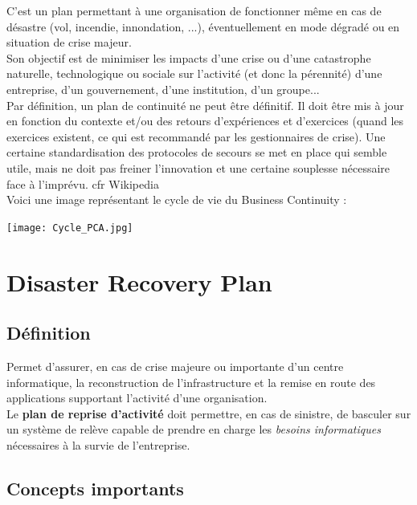 \documentclass{report}
\begin{document}
C'est un plan permettant à une organisation de fonctionner même en cas de désastre (vol, incendie, innondation, ...), éventuellement en mode dégradé ou en situation de crise majeur.\\
Son objectif est de minimiser les impacts d’une crise ou d’une catastrophe naturelle, technologique ou sociale sur l’activité (et donc la pérennité) d’une entreprise, d’un gouvernement, d’une institution, d’un groupe...\\

Par définition, un plan de continuité ne peut être définitif. Il doit être mis à jour en fonction du contexte et/ou des retours d'expériences et d'exercices (quand les exercices existent, ce qui est recommandé par les gestionnaires de crise). Une certaine standardisation des protocoles de secours se met en place qui semble utile, mais ne doit pas freiner l’innovation et une certaine souplesse nécessaire face à l’imprévu. cfr Wikipedia\\

Voici une image représentant le cycle de vie du Business Continuity :

\texttt{[image: Cycle\_PCA.jpg]}

\section{Disaster Recovery Plan}

\subsection{Définition}

Permet d'assurer, en cas de crise majeure ou importante d'un centre informatique, la reconstruction de l'infrastructure et la remise en route des applications supportant l'activité d'une organisation.\\ Le \textbf{plan de reprise d'activité} doit permettre, en cas de sinistre, de basculer sur un système de relève capable de prendre en charge les \textit{besoins informatiques} nécessaires à la survie de l'entreprise.

\subsection{Concepts importants}
\end{document}
